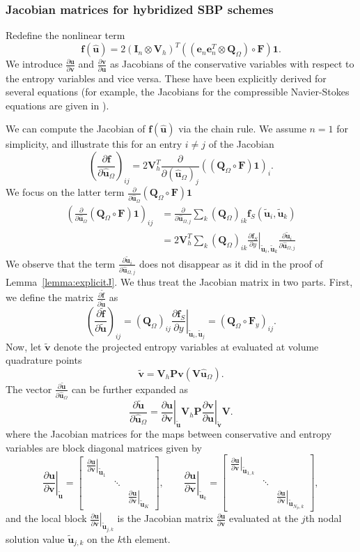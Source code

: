 \documentclass{article}
\renewcommand{\hat}{\widehat}
\renewcommand{\tilde}{\widetilde}
\newcommand{\pd}[2]{\frac{\partial#1}{\partial#2}}
\newcommand{\LRp}[1]{\left( #1 \right)}
\newcommand{\LRl}[1]{\left. #1 \right|}
\newcommand{\eq}[1]{\begin{align*}#1\end{align*}}
\newcommand{\bmat}[1]{\begin{bmatrix}#1\end{bmatrix}}
\begin{document}
\subsubsection{Jacobian matrices for hybridized SBP schemes}

Redefine the nonlinear term 
\[
\bm{f}(\hat{\bm{u}}) = 2\LRp{\bm{I}_n\otimes \bm{V}_h}^T\LRp{ \LRp{\bm{e}_n\bm{e}_n^T\otimes \bm{Q}_{\Omega}} \circ \bm{F}}\bm{1}.
\]
We introduce $\pd{\bm{u}}{\bm{v}}$ and $\pd{\bm{v}}{\bm{u}}$ as Jacobians of the conservative variables with respect to the entropy variables and vice versa.  These have been explicitly derived for several equations (for example, the Jacobians for the compressible Navier-Stokes equations are given in \cite{hughes1986new}).  

We can compute the Jacobian of $\bm{f}(\hat{\bm{u}})$ via the chain rule.  We assume $n=1$ for simplicity, and illustrate this for an entry $i\neq j$ of the Jacobian
\[
\LRp{\pd{\bm{f}}{\hat{\bm{u}}_{\Omega}}}_{ij} =  2 \bm{V}_h^T \pd{}{\LRp{\hat{\bm{u}}_{\Omega}}_j} \LRp{\LRp{\bm{Q}_{\Omega}\circ\bm{F}}\bm{1}}_i.
\]
We focus on the latter term $\pd{}{\hat{\bm{u}}_{\Omega}} \LRp{\bm{Q}_{\Omega}\circ\bm{F}}\bm{1}$
\eq{
\LRp{\pd{}{\hat{\bm{u}}_{\Omega}} \LRp{\bm{Q}_{\Omega}\circ\bm{F}}\bm{1}}_{ij} &= \pd{}{\hat{\bm{u}}_{\Omega,j}} \sum_{k} \LRp{\bm{Q}_{\Omega}}_{ik} \bm{f}_S\LRp{\tilde{\bm{u}}_i,\tilde{\bm{u}}_k} \\
&=  2 \bm{V}_h^T \sum_{k} \LRp{\bm{Q}_{\Omega}}_{ik} \LRl{\pd{\bm{f}_S}{y}}_{\tilde{\bm{u}}_i,\tilde{\bm{u}}_k} \pd{\tilde{\bm{u}}_i}{\hat{\bm{u}}_{\Omega,j}}
}
We observe that the term $\pd{\tilde{\bm{u}}_i}{\hat{\bm{u}}_{\Omega,j}}$ does not disappear as it did in the proof of Lemma~\ref{lemma:explicitJ}.  We thus treat the Jacobian matrix in two parts.  First, we define the matrix $\pd{\tilde{\bm{f}}}{\tilde{\bm{u}}}$ as
\[
\LRp{\pd{\tilde{\bm{f}}}{\tilde{\bm{u}}}}_{ij} = \LRp{\bm{Q}_{\Omega}}_{ij} \LRl{\pd{\bm{f}_S}{y}}_{\tilde{\bm{u}}_i,\tilde{\bm{u}}_j} = \LRp{\bm{Q}_{\Omega}\circ \bm{F}_y}_{ij}.
\]
Now, let $\tilde{\bm{v}}$ denote the projected entropy variables at evaluated at volume quadrature points
\[
\tilde{\bm{v}} = \bm{V}_h\bm{P}\bm{v}\LRp{\bm{V}\hat{\bm{u}}_{\Omega}}.
\]
The vector $\pd{\tilde{\bm{u}}}{\hat{\bm{u}}_{\Omega}}$  can be further expanded as 
\[
\pd{\tilde{\bm{u}}}{\hat{\bm{u}}_{\Omega}} = \LRl{\pd{\bm{u}}{\bm{v}}}_{\tilde{\bm{u}}} \bm{V}_h \bm{P} \LRl{\pd{\bm{v}}{\bm{u}}}_{\tilde{\bm{v}}} \bm{V}.
\]
where the Jacobian matrices for the maps between conservative and entropy variables are block diagonal matrices given by
\[
\LRl{\pd{\bm{u}}{\bm{v}}}_{\tilde{\bm{u}}} = \bmat{
\LRl{\pd{\bm{u}}{\bm{v}}}_{\tilde{\bm{u}}_1} &&\\
& \ddots &\\
&& \LRl{\pd{\bm{u}}{\bm{v}}}_{\tilde{\bm{u}}_K}
}, \qquad \LRl{\pd{\bm{u}}{\bm{v}}}_{\tilde{\bm{u}}_k} = \bmat{
\LRl{\pd{\bm{u}}{\bm{v}}}_{\tilde{\bm{u}}_{1,k}} &&\\
 &\ddots &\\
&& \LRl{\pd{\bm{u}}{\bm{v}}}_{\tilde{\bm{u}}_{N_p,k}}
},
\]
and the local block $\LRl{\pd{\bm{u}}{\bm{v}}}_{\tilde{\bm{u}}_{j,k}}$ is the Jacobian matrix $\pd{\bm{u}}{\bm{v}}$ evaluated at the $j$th nodal solution value $\tilde{\bm{u}}_{j,k}$ on the $k$th element.
\end{document}
